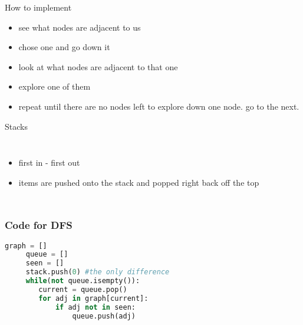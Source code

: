 \documentclass{beamer}
\begin{document}
\begin{frame}{How to implement}
    \begin{itemize}
        \item see what nodes are adjacent to us
        \item chose one and go down it
        \item look at what nodes are adjacent to that one
        \item explore one of them 
        \item repeat until there are no nodes left to explore down one node. go to the next.
    \end{itemize}
\end{frame}
\begin{frame}{Stacks}
    \begin{columns}
            \begin{itemize}
                \item first in - first out
                \item items are pushed onto the stack and popped right back off the top
            \end{itemize}

    \end{columns}
\end{frame}
\begin{frame}[fragile]
\frametitle{Code for DFS}
     \begin{lstlisting}[language=Python]
     graph = []
     queue = [] 
     seen = [] 
     stack.push(0) #the only difference
     while(not queue.isempty()):
        current = queue.pop()
        for adj in graph[current]: 
            if adj not in seen:
                queue.push(adj)
  \end{lstlisting}
\end{frame}
\end{document}
